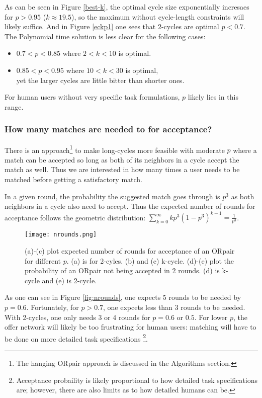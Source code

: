 \documentclass[main.tex]{subfiles}
\begin{document}
As can be seen in Figure \ref{best-k}, the optimal cycle size exponentially incresaes for $p > 0.95$ ($k \approx 19.5$), so the maximum without cycle-length constraints will likely suffice. And in Figure \ref{eckp1} one sees that $2$-cycles are optimal $p < 0.7$. The Polynomial time solution is less clear for the following cases:
\begin{itemize}
  \item $0.7 < p < 0.85$ where $ 2 < k < 10$ is optimal.
  \item $0.85 < p < 0.95$ where $ 10 < k < 30$ is optimal,
      \\yet the larger cycles are little bitter than shorter ones.
\end{itemize}

For human users without very specific task formulations, $p$ likely lies in this range.

\subsubsection{How many matches are needed to for acceptance?}
There is an approach\footnote{The hanging ORpair approach is discussed in the Algorithms section.} to make long-cycles more feasible with moderate $p$ where a match can be accepted so long as both of its neighbors in a cycle accept the match as well. Thus we are interested in how many times a user needs to be matched before getting a satisfactory match.

In a given round, the probability the suggested match goes through is $p^3$ as both neighbors in a cycle also need to accept. Thus the expected number of rounds for acceptance follows the geometric distribution: $\sum_{k=0}^{\infty} k p^3 (1 - p^3)^{k-1} = \frac{1}{p^3}$.

\begin{figure}
  \texttt{[image: nrounds.png]}
  \caption{(a)-(c) plot expected number of rounds for acceptance of an ORpair for different $p$. (a) is for 2-cyles. (b) and (c) k-cycle. (d)-(e) plot the probability of an ORpair not being accepted in 2 rounds. (d) is k-cycle and (e) is 2-cycle.}
  \label{nrounds}
\end{figure}

As one can see in Figure \ref{fig:nrounds}, one expects 5 rounds to be needed by $p = 0.6$. Fortunately, for $p > 0.7$, one expcets less than 3 rounds to be needed. With 2-cycles, one only needs 3 or 4 rounds for $p = 0.6$ or $0.5$. For lower $p$, the offer network will likely be too frustrating for human users: matching will have to be done on more detailed task specifications \footnote{Acceptance probaility is likely proportional to how detailed task specifications are; however, there are also limits as to how detailed humans can be.}.
\end{document}
